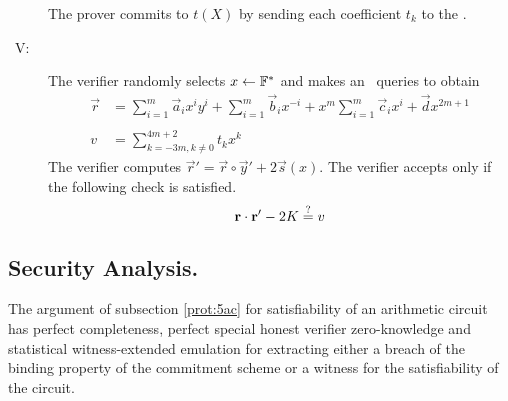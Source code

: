\begin{description}
The prover commits to $t(X)$ by sending each coefficient $t_k$ to the \ILC.

\item[\ V:] The verifier randomly selects $x\gets \mathbb{F}^*$ and makes an \ILCopen\ queries to obtain
\begin{align*}
\vec{r} &= \sum_{i=1}^m\vec{a}_{i}x^{i} y^i+\sum_{i=1}^m\vec{b}_{i} x^{-i}+x^m \sum_{i=1}^m\vec{c}_{i} x^{i}+\vec{d}x^{2m+1}\\ \\
v &= \sum_{k=-3m,k \neq 0}^{4m+2}t_k x^{k}
\end{align*}
The verifier computes $\vec{r}'=\vec{r}\circ \vec{y}' +2\vec{s}(x)$. The verifier accepts only if the following check is satisfied.
$$\mathbf{r}\cdot \mathbf{r}'-2K \overset{?}{=} v$$
\end{description}

\subsection{Security Analysis.}
\begin{thm}\label{th:mainAC}
The argument of subsection \ref{prot:5ac} for satisfiability of an arithmetic circuit has perfect completeness, perfect special honest verifier zero-knowledge and statistical witness-extended emulation for extracting either a breach of the binding property of the commitment scheme or a witness for the satisfiability of the circuit.
\end{thm}

